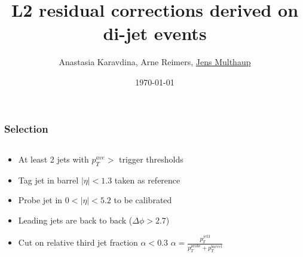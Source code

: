 \documentclass[t,compress]{beamer}
\title[L2 residual corrections]{L2 residual corrections derived on di-jet events}
\author[Jens Multhaup]{Anastasia Karavdina, Arne Reimers, \underline{Jens Multhaup}}
\institute[UHH]{University of Hamburg}
\date{\today}
\begin{document}
\begin{frame}
 \titlepage
\end{frame}


\begin{frame}
 \frametitle{Selection}
 \begin{columns}[t]
\begin{column}{.5\textwidth}
\begin{itemize}
 \item At least 2 jets with $p_T^{ave} > $ trigger thresholds
 \item Tag jet in barrel $|\eta| < 1.3$ taken as reference
 \item Probe jet in $0 < |\eta| < 5.2$ to be calibrated
 \item Leading jets are back to back ($\Delta \phi > 2.7$)
 \item Cut on relative third jet fraction $\alpha < 0.3$ \newline
    $\alpha =\frac{p_T^{jet3}}{p_T^{probe} + p_T^{barrel}}$
\end{itemize}
\end{column}
\begin{column}{.5\textwidth}
\begin{figure}
\end{figure}
\end{column}
\end{columns}
\end{frame}
\end{document}
